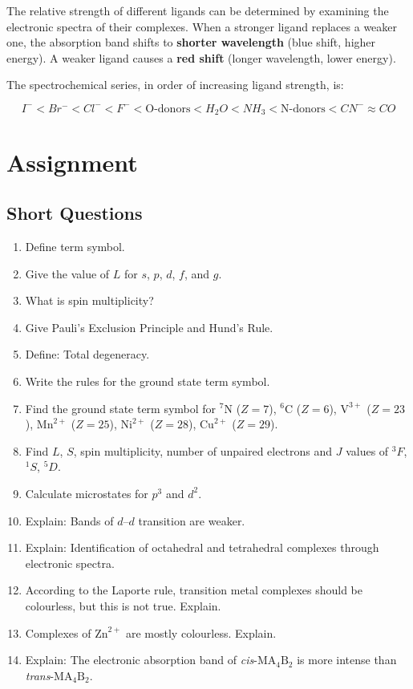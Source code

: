 \documentclass[12pt,a4paper]{article}
\begin{document}
The relative strength of different ligands can be determined by examining the electronic spectra of their complexes. When a stronger ligand replaces a weaker one, the absorption band shifts to \textbf{shorter wavelength} (blue shift, higher energy). A weaker ligand causes a \textbf{red shift} (longer wavelength, lower energy).

The spectrochemical series, in order of increasing ligand strength, is:

\[
I^- < Br^- < Cl^- < F^- < \text{O-donors} < H_2O < NH_3 < \text{N-donors} < CN^- \approx CO
\]

\section{Assignment}

\subsection*{Short Questions}

\begin{enumerate}
  \item Define term symbol.
  \item Give the value of $L$ for $s$, $p$, $d$, $f$, and $g$.
  \item What is spin multiplicity?
  \item Give Pauli's Exclusion Principle and Hund's Rule.
  \item Define: Total degeneracy.
  \item Write the rules for the ground state term symbol.
  \item Find the ground state term symbol for $^7\mathrm{N}$ ($Z=7$), $^6\mathrm{C}$ ($Z=6$), $\mathrm{V}^{3+}$ ($Z=23$), $\mathrm{Mn}^{2+}$ ($Z=25$), $\mathrm{Ni}^{2+}$ ($Z=28$), $\mathrm{Cu}^{2+}$ ($Z=29$).
  \item Find $L$, $S$, spin multiplicity, number of unpaired electrons and $J$ values of ${}^3F$, ${}^1S$, ${}^5D$.
  \item Calculate microstates for $p^3$ and $d^2$.
  \item Explain: Bands of $d$--$d$ transition are weaker.
  \item Explain: Identification of octahedral and tetrahedral complexes through electronic spectra.
  \item According to the Laporte rule, transition metal complexes should be colourless, but this is not true. Explain.
  \item Complexes of $\mathrm{Zn}^{2+}$ are mostly colourless. Explain.
  \item Explain: The electronic absorption band of \textit{cis}-$\mathrm{MA_4B_2}$ is more intense than \textit{trans}-$\mathrm{MA_4B_2}$.
\end{enumerate}
\end{document}
